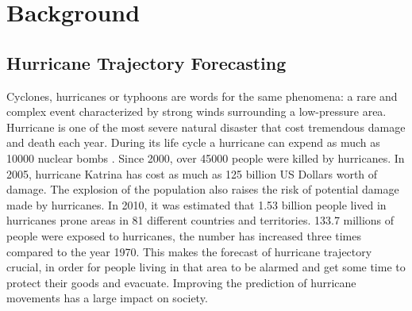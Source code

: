 \chapter{Background}
\label{sec:chapter2}

\section{Hurricane Trajectory Forecasting}
\label{sec:chapter2_1}
Cyclones, hurricanes or typhoons are words for the same phenomena: a rare and complex event characterized by strong winds surrounding a low-pressure area. Hurricane is one of the most severe natural disaster that cost tremendous damage and death each year. During its life cycle a hurricane can expend as much as 10000 nuclear bombs \cite{hurricane_energy}. Since 2000, over 45000 people were killed by hurricanes. In 2005, hurricane Katrina has cost as much as 125 billion US Dollars worth of damage. The explosion of the population also raises the risk of potential damage made by hurricanes\cite{peduzzi2012global}. In 2010, it was estimated that 1.53 billion people lived in hurricanes prone areas in 81 different countries and territories. 133.7 millions of people were exposed to hurricanes, the number has increased three times compared to the year 1970. This makes the forecast of hurricane trajectory crucial, in order for people living in that area to be alarmed and get some time to protect their goods and evacuate. Improving the prediction of hurricane movements has a large impact on society.



